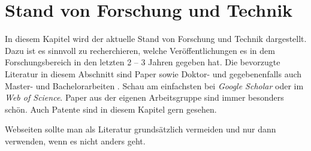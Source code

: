 


\section{Stand von Forschung und Technik}

In diesem Kapitel wird der aktuelle Stand von Forschung und Technik dargestellt. Dazu ist es sinnvoll zu recherchieren, welche Veröffentlichungen es in dem Forschungsbereich in den letzten 2 -- 3 Jahren gegeben hat. Die bevorzugte Literatur in diesem Abschnitt sind Paper \citep{Peters2017,Peters2018,Bruggeman2013} sowie Doktor- und gegebenenfalls auch Master- und Bachelorarbeiten \citep{Hirschberg2017,Freier2013}. Schau am einfachsten bei \textit{Google Scholar} oder im \textit{Web of Science}. Paper aus der eigenen Arbeitsgruppe sind immer besonders schön. Auch Patente \cite{Liepack2011} sind in diesem Kapitel gern gesehen. 

Webseiten \citep{Northstar2018} sollte man als Literatur grundsätzlich vermeiden und nur dann verwenden, wenn es nicht anders geht.








